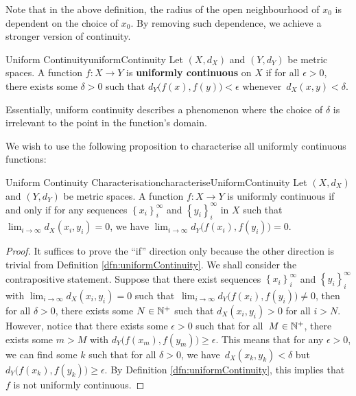\documentclass[math]{amznotes}
\theoremstyle{remark}
\begin{document}
Note that in the above definition, the radius of the open neighbourhood of $x_0$ is dependent on the choice of $x_0$. By removing such dependence, we achieve a stronger version of continuity.
\begin{dfnbox}{Uniform Continuity}{uniformContinuity}
    Let $\left(X, d_X\right)$ and $\left(Y, d_Y\right)$ be metric spaces. A function $f \colon X \to Y$ is {\color{red} \textbf{uniformly continuous}} on $X$ if for all $\epsilon > 0$, there exists some $\delta > 0$ such that $d_Y\bigl(f\left(x\right), f\left(y\right)\bigr) < \epsilon$ whenever~$d_X\left(x, y\right) < \delta$.
\end{dfnbox}
Essentially, uniform continuity describes a phenomenon where the choice of $\delta$ is irrelevant to the point in the function's domain.

We wish to use the following proposition to characterise all uniformly continuous functions:
\begin{probox}{Uniform Continuity Characterisation}{characteriseUniformContinuity}
    Let $\left(X, d_X\right)$ and $\left(Y, d_Y\right)$ be metric spaces. A function $f \colon X \to Y$ is uniformly continuous if and only if for any sequences $\left\{x_i\right\}_i^{\infty}$ and $\left\{y_i\right\}_{i}^{\infty}$ in $X$ such that $\lim_{i \to \infty}d_X\left(x_i, y_i\right) = 0$, we have $\lim_{i \to \infty}d_Y\bigl(f\left(x_i\right), f\left(y_i\right)\bigr) = 0$.
    \tcblower
    \begin{proof}
        It suffices to prove the ``if'' direction only because the other direction is trivial from Definition \ref{dfn:uniformContinuity}. We shall consider the contrapositive statement. Suppose that there exist sequences $\left\{x_i\right\}_i^{\infty}$ and $\left\{y_i\right\}_{i}^{\infty}$ with $\lim_{i \to \infty}d_X\left(x_i, y_i\right) = 0$ such that~$\lim_{i \to \infty}d_Y\bigl(f\left(x_i\right), f\left(y_i\right)\bigr) \neq 0$, then for all $\delta > 0$, there exists some $N \in \mathbb{N}^+$ such that $d_X\left(x_i, y_i\right) > 0$ for all $i > N$. However, notice that there exists some $\epsilon > 0$ such that for all~$M \in \mathbb{N}^+$, there exists some $m > M$ with $d_Y\bigl(f\left(x_m\right), f\left(y_m\right)\bigr) \geq \epsilon$. This means that for any $\epsilon > 0$, we can find some $k$ such that for all $\delta > 0$, we have~$d_X\left(x_k, y_k\right) < \delta$ but $d_Y\bigl(f\left(x_k\right), f\left(y_k\right)\bigr) \geq \epsilon$. By Definition \ref{dfn:uniformContinuity}, this implies that $f$ is not uniformly continuous.
    \end{proof}
\end{probox}
\end{document}
